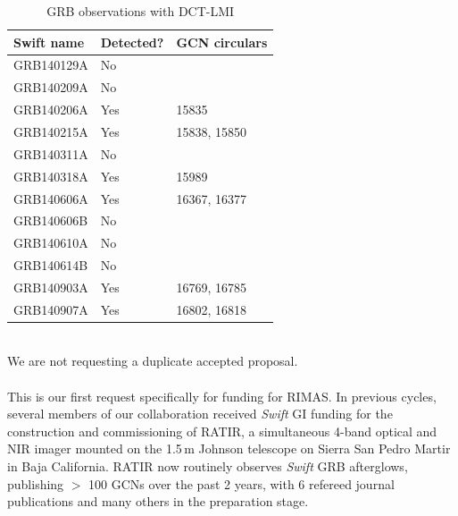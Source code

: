 \documentclass[letterpaper,11pt]{article}
\begin{document}
	\begin{table}[ht]
		\vspace{-0.4cm}
		\centering 
		\begin{tabular}{lll}
			\hline\hline
			\textbf{Swift name} & \textbf{Detected?} & \textbf{GCN circulars}		\\
			\hline
			GRB140129A			& No					&							\\
			GRB140209A			& No					&							\\
			GRB140206A			& Yes					& 15835						\\
			GRB140215A			& Yes					& 15838, 15850				\\
			GRB140311A			& No					&							\\
			GRB140318A			& Yes					& 15989						\\
			GRB140606A			& Yes					& 16367, 16377				\\
			GRB140606B			& No					&							\\
			GRB140610A			& No					&							\\
			GRB140614B			& No					&							\\
			GRB140903A			& Yes					& 16769, 16785				\\
			GRB140907A			& Yes					& 16802, 16818				\\
			\hline
		\end{tabular}
		\caption{GRB observations with DCT-LMI}
		\label{table:DCTobs} 
	\end{table}

\smallskip\\
We are not requesting a duplicate accepted proposal.\\

\smallskip\\
This is our first request specifically for funding for RIMAS.  In previous cycles,
several members of our collaboration received \textit{Swift} GI funding for the 
construction and commissioning of RATIR, a simultaneous 4-band optical and NIR
imager mounted on the 1.5\,m Johnson telescope on Sierra San Pedro Martir in Baja 
California.  RATIR now routinely observes \textit{Swift} GRB afterglows, publishing
$>$ 100 GCNs over the past 2 years, with 6 refereed journal publications and 
many others in the preparation stage. \\
\end{document}

